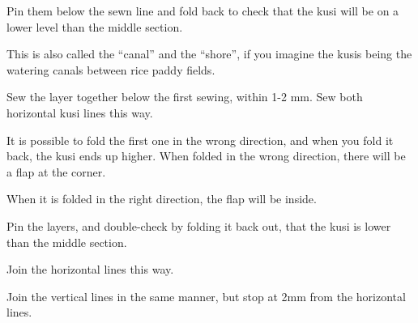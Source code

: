 
Pin them below the sewn line and fold back to check that the kusi will
be on a lower level than the middle section.


\setlength{\nextPhotoWidth}{0.5\textwidth}


This is also called the ``canal'' and the ``shore'', if you imagine the
kusis being the watering canals between rice paddy fields.

Sew the layer together below the first sewing, within 1-2 mm. Sew both
horizontal kusi lines this way.

\begin{multicols}{2}

\setlength{\nextPhotoWidth}{0.8\linewidth}


\columnbreak

\setlength{\nextPhotoWidth}{\linewidth}


\end{multicols}

\clearpage

It is possible to fold the first one in the wrong direction, and when
you fold it back, the kusi ends up higher. When folded in the wrong
direction, there will be a flap at the corner.

When it is folded in the right direction, the flap will be inside.

\setlength{\nextPhotoWidth}{0.5\textwidth}



Pin the layers, and double-check by folding it back out, that the kusi
is lower than the middle section.

Join the horizontal lines this way.


Join the vertical lines in the same manner, but stop at 2mm from the
horizontal lines.

